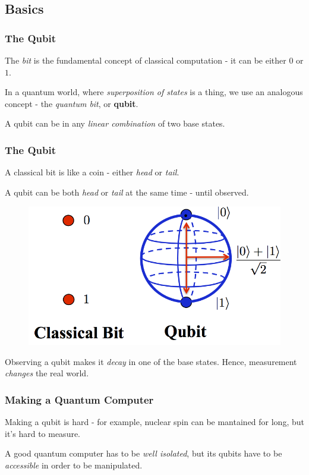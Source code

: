 \documentclass{beamer}
\begin{document}
  \subsection{Basics}
  \begin{frame}
    \frametitle{The Qubit}
    The \textit{bit} is the fundamental concept of classical computation - it can be either $0$ or $1$.

    In a quantum world, where \textit{superposition of states} is a thing, we use an analogous concept -
    the \textit{quantum bit}, or \textbf{qubit}.

    A qubit can be in any \textit{linear combination} of two base states.
  \end{frame}
  \begin{frame}
    \frametitle{The Qubit}
    A classical bit is like a coin - either \textit{head} or \textit{tail}.

    A qubit can be both \textit{head} or \textit{tail} at the same time - until observed.

    \begin{figure}[H]
      \centering
      \includegraphics[width=0.5\linewidth]{qubit.png}
    \end{figure}

    Observing a qubit makes it \textit{decay} in one of the base states. Hence, measurement
    \textit{changes} the real world.
  \end{frame}
  \begin{frame}
    \frametitle{Making a Quantum Computer}
    Making a qubit is hard - for example, nuclear spin can be mantained for long, but it's hard to measure.

    A good quantum computer has to be \textit{well isolated}, but its qubits have to be \textit{accessible}
    in order to be manipulated.
  \end{frame}
  
\end{document}
